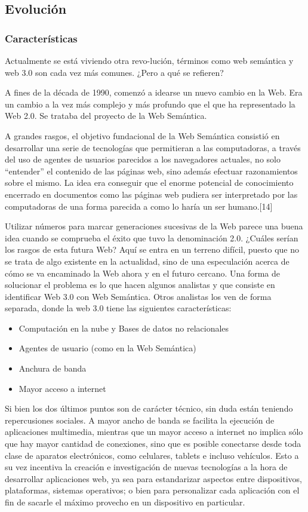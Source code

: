 \subsection{Evolución}
\subsubsection{Características}
Actualmente se está viviendo otra revo-lución, términos como web semántica y web 3.0 son cada vez más comunes. ¿Pero a qué se refieren?

A fines de la década de 1990, comenzó a idearse un nuevo cambio en la Web. Era un cambio a la vez más complejo y más profundo que el que 
ha representado la Web 2.0. Se trataba del proyecto de la Web Semántica.

A grandes rasgos, el objetivo fundacional de la Web Semántica consistió en desarrollar una serie de tecnologías que permitieran a las
computadoras, a través del uso de agentes de usuarios parecidos a los navegadores actuales, no solo “entender” el contenido de las 
páginas web, sino además efectuar razonamientos sobre el mismo. La idea era conseguir que el enorme potencial de conocimiento
encerrado en documentos como las páginas web pudiera ser interpretado por las computadoras de una forma parecida a como lo haría 
un ser humano.[14]

Utilizar números para marcar generaciones sucesivas de la Web parece una buena idea cuando se comprueba el éxito que tuvo la denominación 
2.0. ¿Cuáles serían los rasgos de esta futura Web? Aquí se entra en un terreno difícil, puesto que no se trata de algo existente en la
actualidad, sino de una especulación acerca de cómo se va encaminado la Web ahora y en el futuro cercano. Una forma de solucionar el 
problema es lo que hacen algunos analistas y que consiste en identificar Web 3.0 con Web Semántica. Otros analistas los ven de forma 
separada, donde la web 3.0 tiene las siguientes características:
\begin{itemize}
 \item Computación en la nube y Bases de datos no relacionales
 \item Agentes de usuario (como en la Web Semántica)
 \item Anchura de banda
 \item Mayor acceso a internet
\end{itemize}

Si bien los dos últimos puntos son de carácter técnico, sin duda están teniendo repercusiones sociales. A mayor ancho de banda se facilita
la ejecución de aplicaciones multimedia, mientras que un mayor acceso a internet no implica sólo que hay mayor cantidad de conexiones,
sino que es posible conectarse desde toda clase de aparatos electrónicos, como celulares, tablets e incluso vehículos. Esto a su
vez incentiva la creación e investigación de nuevas tecnologías a la hora de desarrollar aplicaciones web, ya sea para estandarizar
aspectos entre dispositivos, plataformas, sistemas operativos; o bien para personalizar cada aplicación con el fin de sacarle el máximo
provecho en un dispositivo en particular.

